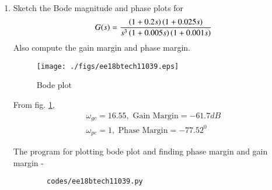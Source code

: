 \begin{enumerate}[label=\thesubsection.\arabic*.,ref=\thesubsection.\theenumi]
    
    \item Sketch the Bode magnitude and phase plots for 
    \begin{align}
        G(s) = \frac{\left(1+0.2s\right)\left(1+0.025s\right)}{s^3\left(1+0.005s\right)\left(1+0.001s\right)}
    \end{align}
    Also compute the gain margin and phase margin.\\
    \solution
    
    \begin{figure}[!h]
    \centering
      \texttt{[image: ./figs/ee18btech11039.eps]}
      \caption{Bode plot}
      \label{fig:ee18btech11039}
    \end{figure}
    
    From fig. \ref{fig:ee18btech11039},
    \begin{align}
        \omega_{gc} = 16.55, \text{ Gain Margin} = -61.7 dB \\
        \omega_{pc} = 1, \text{ Phase Margin} = -77.52^0
    \end{align}
    
    The program for plotting bode plot and finding phase margin and gain margin -
    \begin{lstlisting}
        codes/ee18btech11039.py
    \end{lstlisting}
    
    \end{enumerate}
    
    
